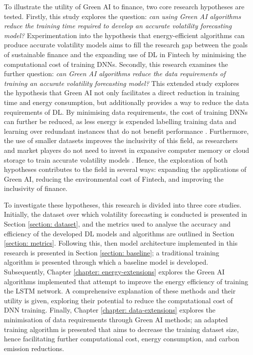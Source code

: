\documentclass[a4paper, 11pt]{report}
\begin{document}
    To illustrate the utility of Green AI to finance, two core research hypotheses are tested. Firstly, this study explores the question: \emph{can using Green AI algorithms reduce the training time required to develop an accurate volatility forecasting model?} Experimentation into the hypothesis that energy-efficient algorithms can produce accurate volatility models aims to fill the research gap between the goals of sustainable finance and the expanding use of DL in Fintech by minimising the computational cost of training DNNs. Secondly, this research examines the further question: \emph{can Green AI algorithms reduce the data requirements of training an accurate volatility forecasting model?} This extended study explores the hypothesis that Green AI not only facilitates a direct reduction in training time and energy consumption, but additionally provides a way to reduce the data requirements of DL. By minimising data requirements, the cost of training DNNs can further be reduced, as less energy is expended labelling training data and learning over redundant instances that do not benefit performance \citep{schwartz-2019}. Furthermore, the use of smaller datasets improves the inclusivity of this field, as researchers and market players do not need to invest in expansive computer memory or cloud storage to train accurate volatility models \citep{strubell-2019}. Hence, the exploration of both hypotheses contributes to the field in several ways: expanding the applications of Green AI, reducing the environmental cost of Fintech, and improving the inclusivity of finance.

    To investigate these hypotheses, this research is divided into three core studies. Initially, the dataset over which volatility forecasting is conducted is presented in Section \ref{section: dataset}, and the metrics used to analyse the accuracy and efficiency of the developed DL models and algorithms are outlined in Section \ref{section: metrics}. Following this, then model architecture implemented in this research is presented in Section \ref{section: baseline}; a traditional training algorithm is presented through which a baseline model is developed. Subsequently, Chapter \ref{chapter: energy-extensions} explores the Green AI algorithms implemented that attempt to improve the energy efficiency of training the LSTM network. A comprehensive explanation of these methods and their utility is given, exploring their potential to reduce the computational cost of DNN training. Finally, Chapter \ref{chapter: data-extensions} explores the minimisation of data requirements through Green AI methods; an adapted training algorithm is presented that aims to decrease the training dataset size, hence facilitating further computational cost, energy consumption, and carbon emission reductions.
\end{document}
